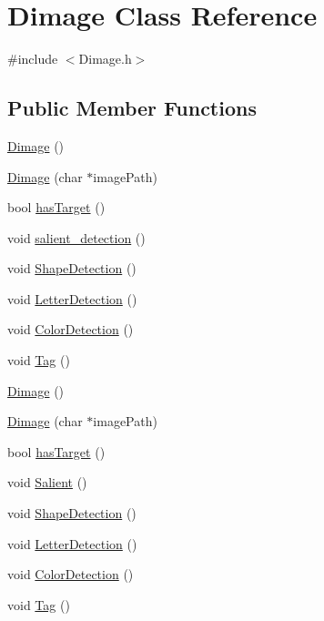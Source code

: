 \hypertarget{classDimage}{\section{Dimage Class Reference}
\label{classDimage}
}


{\ttfamily \#include $<$Dimage.\-h$>$}

\subsection*{Public Member Functions}
\begin{DoxyCompactItemize}
\item 
\hyperlink{classDimage_a7f9e6f11d276696ece0e965bf7b49a59}{Dimage} ()
\item 
\hyperlink{classDimage_a5e4573b7b090d1a4da4c8782f78d91f7}{Dimage} (char $\ast$image\-Path)
\item 
bool \hyperlink{classDimage_ac6b561cd3c19c9ec5947932a3ad0e2fb}{has\-Target} ()
\item 
void \hyperlink{classDimage_a5a7fb91f2c4781473f71e3da828c1015}{salient\-\_\-detection} ()
\item 
void \hyperlink{classDimage_ab8edde46632c1ef26cd7b85357fb9e88}{Shape\-Detection} ()
\item 
void \hyperlink{classDimage_ab4ed2ec1c9edca1ae07459aaa46e440b}{Letter\-Detection} ()
\item 
void \hyperlink{classDimage_a0340c98df1a38d7026fa3816e0f78e90}{Color\-Detection} ()
\item 
void \hyperlink{classDimage_a49206c6028e3121d4cc320a835fa702b}{Tag} ()
\item 
\hyperlink{classDimage_a7f9e6f11d276696ece0e965bf7b49a59}{Dimage} ()
\item 
\hyperlink{classDimage_a5e4573b7b090d1a4da4c8782f78d91f7}{Dimage} (char $\ast$image\-Path)
\item 
bool \hyperlink{classDimage_ac6b561cd3c19c9ec5947932a3ad0e2fb}{has\-Target} ()
\item 
void \hyperlink{classDimage_a7e0080a7a776f312698e7112fd827dd0}{Salient} ()
\item 
void \hyperlink{classDimage_ab8edde46632c1ef26cd7b85357fb9e88}{Shape\-Detection} ()
\item 
void \hyperlink{classDimage_ab4ed2ec1c9edca1ae07459aaa46e440b}{Letter\-Detection} ()
\item 
void \hyperlink{classDimage_a0340c98df1a38d7026fa3816e0f78e90}{Color\-Detection} ()
\item 
void \hyperlink{classDimage_a49206c6028e3121d4cc320a835fa702b}{Tag} ()
\end{DoxyCompactItemize}
